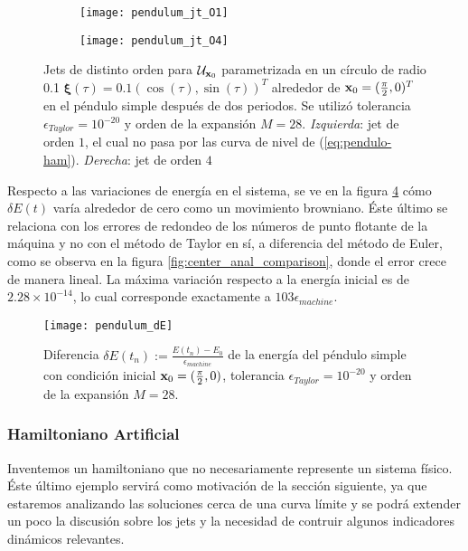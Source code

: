 \begin{figure}[h!]
\centering
\begin{subfigure}{0.49\textwidth}
	\centering
	\texttt{[image: pendulum\_jt\_O1]}
	\label{fig:pendulum_jt_O1}
\end{subfigure}
%
\begin{subfigure}{0.49\textwidth}
	\centering
	\texttt{[image: pendulum\_jt\_O4]}
	\label{fig:pendulum_jt_O4}
\end{subfigure}
\caption{Jets de distinto orden para $\mathcal{U}_{\mathbf{x}_0}$ parametrizada en un círculo de radio 0.1 $\mathbf{\xi}(\tau) = 0.1\left( \cos(\tau),\sin(\tau) \right)^T$ alrededor de $\mathbf{x}_0 = (\frac{\pi}{2},0)^T$ en el péndulo simple después de dos periodos. Se utilizó tolerancia $\epsilon_{Taylor} = 10^{-20}$ y orden de la expansión $M = 28$. \textit{Izquierda}: jet de orden $1$, el cual no pasa por las curva de nivel de (\ref{eq:pendulo-ham}). \textit{Derecha}: jet de orden $4$}
\label{fig:pendulum_jt}
\end{figure}

Respecto a las variaciones de energía en el sistema, se ve en la figura \ref{fig:pendulum_dE} cómo $\delta E(t)$ varía alrededor de cero como un movimiento browniano. Éste último se relaciona con los errores de redondeo de los números de punto flotante de la máquina y no con el método de Taylor en sí, a diferencia del método de Euler, como se observa en la figura \ref{fig:center_anal_comparison}, donde el error crece de manera lineal. La máxima variación respecto a la energía inicial es de $2.28\times10^{-14}$, lo cual corresponde exactamente a $103 \epsilon_{machine}$.

\begin{figure}[h!]
 \centering
 \texttt{[image: pendulum\_dE]}
 \caption{Diferencia $\delta E(t_n) := \frac{E(t_n) - E_0}{\epsilon_{machine}}$ de la energía del péndulo simple con condición inicial $\mathbf{x}_0 = (\frac{\pi}{2},0)$, tolerancia $\epsilon_{Taylor} = 10^{-20}$ y orden de la expansión $M = 28$.}
 \label{fig:pendulum_dE}
\end{figure}

\subsubsection{Hamiltoniano Artificial}
\label{sec:artificial_ham}

Inventemos un hamiltoniano que no necesariamente represente un sistema físico. Éste último ejemplo servirá como motivación de la sección siguiente, ya que estaremos analizando las soluciones cerca de una curva límite y se podrá extender un poco la discusión sobre los jets y la necesidad de contruir algunos indicadores dinámicos relevantes. 

